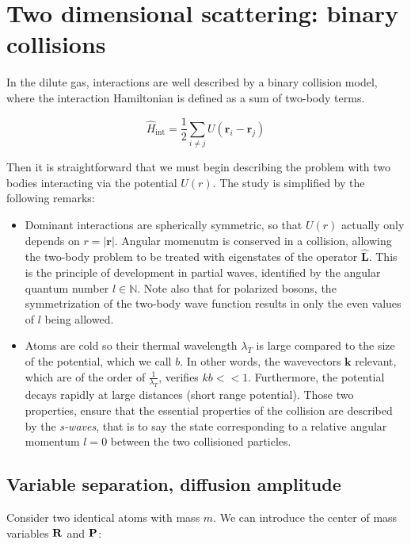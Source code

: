 \appendix
\section{Two dimensional scattering: binary collisions}

In the dilute gas, interactions are well described by a binary collision model, where the interaction Hamiltonian is defined as a sum of two-body terms.

\begin{equation}
    \hat{H}_{\text{int}} =\frac{1}{2} \sum_{i \neq j} U({\mathbf{r}}_i - {\mathbf{r}}_j)
\end{equation}

Then it is straightforward that we must begin describing the problem with two bodies interacting via the potential $U(r)$. The study is simplified by the following remarks:

\begin{itemize}
    \item Dominant interactions are spherically symmetric, so that $U(r)$ actually only depends on $r=|\mathbf{r}|$. Angular momenutm is conserved in a collision, allowing the two-body problem to be treated with eigenstates of the operator $\hat{\mathbf{L}}$. This is the principle of development in partial waves, identified by the angular quantum number $l\in\mathbb N$. Note also that for polarized bosons, the symmetrization of the two-body wave function results in only the even values of $l$ being allowed.
    \item Atoms are cold so their thermal wavelength $\lambda_T$ is large compared to the size of the potential, which we call $b$. In other words, the wavevectors $\mathbf{k}$ relevant, which are of the order of $\frac{1}{\lambda_T}$, verifies $kb<<1$. Furthermore, the potential decays rapidly at large distances (short range potential). Those two properties, ensure that the essential properties of the collision are described by the \textit{s-waves}, that is to say the state corresponding to a relative angular momentum $l=0$ between the two collisioned particles.
\end{itemize}

\subsection{Variable separation, diffusion amplitude}

Consider two identical atoms with mass $m$. We can introduce the center of mass variables $\vb{R}$ and $\vb{P}$:

